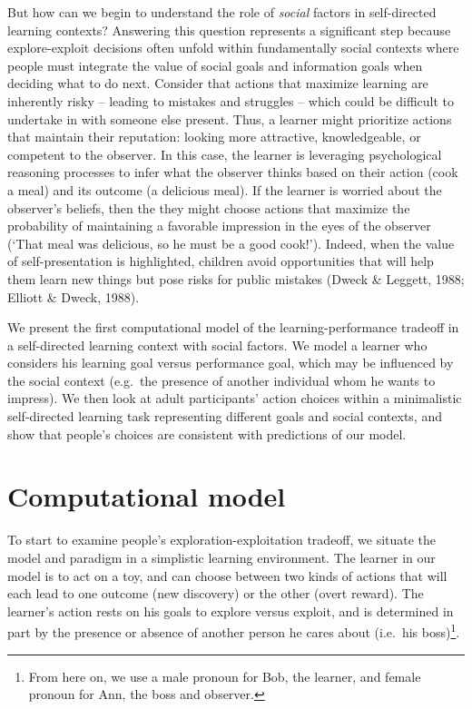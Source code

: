 \documentclass[10pt, letterpaper]{article}
\begin{document}
But how can we begin to understand the role of \emph{social} factors in
self-directed learning contexts? Answering this question represents a
significant step because explore-exploit decisions often unfold within
fundamentally social contexts where people must integrate the value of
social goals and information goals when deciding what to do next.
Consider that actions that maximize learning are inherently risky --
leading to mistakes and struggles -- which could be difficult to
undertake in with someone else present. Thus, a learner might prioritize
actions that maintain their reputation: looking more attractive,
knowledgeable, or competent to the observer. In this case, the learner
is leveraging psychological reasoning processes to infer what the
observer thinks based on their action (cook a meal) and its outcome (a
delicious meal). If the learner is worried about the observer's beliefs,
then the they might choose actions that maximize the probability of
maintaining a favorable impression in the eyes of the observer (`That
meal was delicious, so he must be a good cook!'). Indeed, when the value
of self-presentation is highlighted, children avoid opportunities that
will help them learn new things but pose risks for public mistakes
(Dweck \& Leggett, 1988; Elliott \& Dweck, 1988).

We present the first computational model of the learning-performance
tradeoff in a self-directed learning context with social factors. We
model a learner who considers his learning goal versus performance goal,
which may be influenced by the social context (e.g.~the presence of
another individual whom he wants to impress). We then look at adult
participants' action choices within a minimalistic self-directed
learning task representing different goals and social contexts, and show
that people's choices are consistent with predictions of our model.

\section{Computational model}\label{computational-model}

To start to examine people's exploration-exploitation tradeoff, we
situate the model and paradigm in a simplistic learning environment. The
learner in our model is to act on a toy, and can choose between two
kinds of actions that will each lead to one outcome (new discovery) or
the other (overt reward). The learner's action rests on his goals to
explore versus exploit, and is determined in part by the presence or
absence of another person he cares about (i.e.~his
boss)\footnote{From here on, we use a male pronoun for Bob, the learner, and female pronoun for Ann, the boss and observer.}.
\end{document}
